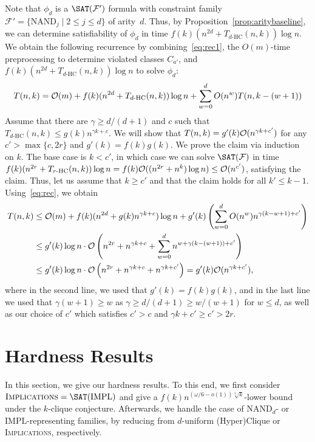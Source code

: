 \documentclass[10pt,a4paper]{article}
\theoremstyle{plain}
\newcommand{\Oh}{{\cal O}}
\newcommand{\NAND}{\mathrm{NAND}}
\newcommand{\Impl}{\mathrm{IMPL}}
\newcommand{\confam}{\mathcal{F}}
\newcommand{\Implication}{\textsc{Implications}\xspace}
\newcommand{\THC}[1]{T_{#1\text{-HC}}}
\begin{document}
%
  Note that $\phi_d$ is a $\SAT(\confam')$ formula with constraint family $\confam' = \{ \NAND_j \mid 2 \le j \le d\}$ of arity~$d$. Thus, by Proposition~\ref{prop:aritybaseline}, we can determine satisfiability of $\phi_d$ in time $f(k) (n^{2d} + \THC{d}(n, k))\log n$. We obtain the following recurrence by combining~\eqref{eq:rec1}, the $O(m)$-time preprocessing to determine violated classes $C_{a'}$, and $f(k)(n^{2d} + \THC{d}(n,k))\log n$ to solve $\phi_d$:  
  \begin{equation}\label{eq:rec}
  T(n,k) =  \Oh(m) + f(k)(n^{2d} + \THC{d}(n,k))\log n + \sum_{w=0}^d O(n^w) T(n, k-(w+1))
  \end{equation}
%
  Assume that there are $\gamma \ge d/(d+1)$ and $c$ such that $\THC{d}(n,k) \le g(k)n^{\gamma k+c}$. We will show that  $T(n,k) = g'(k)\Oh(n^{\gamma k + c'})$ for any $c'>\max\{c, 2r\}$ and $g'(k) = f(k)g(k)$. 
%
  We prove the claim via induction on $k$. The base case is $k < c'$, in which case we can solve $\SAT(\confam)$ in time $f(k)(n^{2r} + \THC{r}(n,k))\log n = f(k)\Oh((n^{2r}+n^k)\log n) \le \Oh(n^{c'})$, satisfying the claim. Thus, let us assume that $k \ge c'$ and that the claim holds for all $k'\le k-1$. Using~\eqref{eq:rec}, we obtain
\begin{align*}
T(n,k) & \le \Oh(m) + f(k)(n^{2d} + g(k) n^{\gamma k + c})\log n + g'(k) \left(\sum_{w=0}^d O(n^w) n^{\gamma (k-w+1) + c'}\right) \\
    & \le g'(k) \log n\cdot \Oh\left(n^{2r} + n^{\gamma k + c} + \sum_{w=0}^d n^{w + \gamma(k-(w+1)) + c'}\right) \\
    & \le g'(k) \log n\cdot \Oh\left(n^{2r} + n^{\gamma k + c} + n^{\gamma k + c'}\right) = g'(k) \Oh(n^{\gamma k + c'}),
\end{align*}
where in the second line, we used that $g'(k) = f(k)g(k)$, and in the last line we used that $\gamma(w+1) \ge w$ as $\gamma \ge d/(d+1) \ge w/(w+1)$ for $w\le d$, as well as our choice of $c'$ which satisfies $c' > c$ and $\gamma k + c' \ge c' > 2r$.
%
%
\section{Hardness Results}
\label{sec:hardness}
%
In this section, we give our hardness results. To this end, we first consider $\Implication = \SAT(\Impl)$ and give a $f(k)n^{(\omega/6-o(1))\sqrt[3]{k}}$-lower bound under the $k$-clique conjecture. Afterwards, we handle the case of $\NAND_{d}$- or $\Impl$-representing families, by reducing from $d$-uniform (Hyper)Clique or \Implication, respectively.
%
\end{document}
